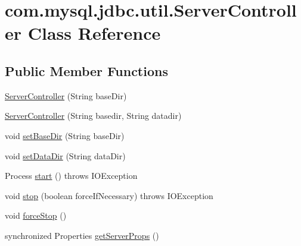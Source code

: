 \hypertarget{classcom_1_1mysql_1_1jdbc_1_1util_1_1_server_controller}{}\section{com.\+mysql.\+jdbc.\+util.\+Server\+Controller Class Reference}
\label{classcom_1_1mysql_1_1jdbc_1_1util_1_1_server_controller}
\subsection*{Public Member Functions}
\begin{DoxyCompactItemize}
\item 
\mbox{\hyperlink{classcom_1_1mysql_1_1jdbc_1_1util_1_1_server_controller_aa9752aa2669c5aa953af66f978cf09a1}{Server\+Controller}} (String base\+Dir)
\item 
\mbox{\hyperlink{classcom_1_1mysql_1_1jdbc_1_1util_1_1_server_controller_aedc0e2a7413502f19130574fc8785b6f}{Server\+Controller}} (String basedir, String datadir)
\item 
void \mbox{\hyperlink{classcom_1_1mysql_1_1jdbc_1_1util_1_1_server_controller_a231fbe6ed87c19ede2f71fa92e79cf78}{set\+Base\+Dir}} (String base\+Dir)
\item 
void \mbox{\hyperlink{classcom_1_1mysql_1_1jdbc_1_1util_1_1_server_controller_a722d9aabaa42a36226901125e1580e72}{set\+Data\+Dir}} (String data\+Dir)
\item 
Process \mbox{\hyperlink{classcom_1_1mysql_1_1jdbc_1_1util_1_1_server_controller_aa6f82711f8bfe6c99c5bb1e89d5dd55f}{start}} ()  throws I\+O\+Exception 
\item 
void \mbox{\hyperlink{classcom_1_1mysql_1_1jdbc_1_1util_1_1_server_controller_a5a5c3f6222dbf1172ce2537456118925}{stop}} (boolean force\+If\+Necessary)  throws I\+O\+Exception 
\item 
void \mbox{\hyperlink{classcom_1_1mysql_1_1jdbc_1_1util_1_1_server_controller_abb29f56e32e318eb294573cd0023e8f5}{force\+Stop}} ()
\item 
synchronized Properties \mbox{\hyperlink{classcom_1_1mysql_1_1jdbc_1_1util_1_1_server_controller_a2e172aa91ee196f2e0eacd651f2ae616}{get\+Server\+Props}} ()
\end{DoxyCompactItemize}
